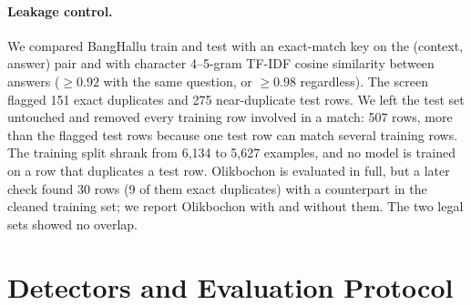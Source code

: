 \documentclass[manuscript,screen,review]{acmart}
\newcommand{\fit}[1]{\resizebox{\ifdim\width>\linewidth\linewidth\else\width\fi}{!}{#1}}
\begin{document}
\begin{table}[t]
\caption{Datasets. ``Ctx.'' is the share of rows with a non-empty context passage. For Olikbochon and the legal sets the columns give the source splits; we train on none of them, and all their rows are used for evaluation only. Legal sets carry no hallucination labels; their detection task is constructed in Section~\ref{sec:legal}.}
\label{tab:datasets}
\small
\fit{}
\end{table}

\paragraph{Leakage control.}
We compared BangHallu train and test with an exact-match key on the (context, answer) pair and with character 4--5-gram TF-IDF cosine similarity between answers ($\geq 0.92$ with the same question, or $\geq 0.98$ regardless). The screen flagged 151 exact duplicates and 275 near-duplicate test rows. We left the test set untouched and removed every training row involved in a match: 507 rows, more than the flagged test rows because one test row can match several training rows. The training split shrank from 6,134 to 5,627 examples, and no model is trained on a row that duplicates a test row. Olikbochon is evaluated in full, but a later check found 30 rows (9 of them exact duplicates) with a counterpart in the cleaned training set; we report Olikbochon with and without them. The two legal sets showed no overlap.

\section{Detectors and Evaluation Protocol}\label{sec:method}
\end{document}
